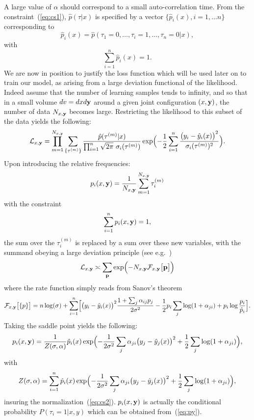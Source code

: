 \documentclass[envcountsect,runningheads]{llncs}
\theoremstyle{etoile}
\begin{document}
A large value of $\alpha$ should correspond to a small auto-correlation time. From the constraint~(\ref{eq:cs1}), $\hat p(\tau\vert x)$ is specified by  a vector
$\{\hat p_i(x),i=1,\dots n\}$ corresponding to
\[
\hat p_i(x) = \hat p(\tau_1=0,\ldots,\tau_i=1,\ldots,\tau_n=0\vert x),
\]
with 
\[
\sum_{i=1}^n \hat p_i(x) = 1.
\]
We are now in position to justify the loss function which will be used later on to train our model, as arising from a large deviation functional of the likelihood. Indeed assume that the number of learning samples tends to infinity, and so that in a small volume $dv = dxd{\bf y}$ around a given  joint configuration $(x,{\bf y})$, the number of data $N_{x,{\bf y}}$ becomes large. Restricting the likelihood to this subset of the data yields the following:
\[
{\cal L}_{x,{\bf y}} = \prod_{m=1}^{N_{x,{\bf y}}} \sum_{\{\tau^{(m)}\}} 
\frac{\hat p(\tau^{(m)}\vert x)}{\prod_{i=1}^n\sqrt{2\pi}\ \sigma_i(\tau^{(m)})}
\exp\Bigl(-\frac{1}{2}\sum_{i=1}^n\frac{\bigl(y_i-\hat y_i(x)\bigr)^2}{\sigma_i(\tau^{(m)})^2}\Bigr).
\]
Upon introducing the relative frequencies:
\[
p_i(x,{\bf y}) = \frac{1}{N_{x,{\bf y}}}\sum_{m=1}^{N_{x,{\bf y}}} \tau_i^{(m)} 
\]
with the constraint
\begin{equation}\label{eq:cs2}
\sum_{i=1}^n p_i(x,{\bf y}) = 1,
\end{equation}
the sum over the $\tau_i^{(m)}$ is replaced by a sum over these new variables, with the summand obeying a large deviation principle (see e.g.~\cite{Touchette})
\[
{\cal L}_{x,{\bf y}} \asymp \sum_{{\bf p}} 
\exp\Bigl(-N_{x,{\bf y}} {\cal F}_{x,{\bf y}}\bigl[{\bf p}\bigr]\Bigr)
\]
where the rate function simply reads from Sanov's theorem
\[
{\cal F}_{x,{\bf y}}\bigl[\{p\}\bigr] = n\log(\sigma)+
\sum_{i=1}^n\Bigl[\bigl(y_i-\hat y_i(x)\bigr)^2\frac{1+\sum_j\alpha_{ij}p_j}{2\sigma^2}
-\frac{1}{2}p_i\sum_j\log(1+\alpha_{ji})+p_i\log\frac{p_i}{\hat p_i}\Bigr].
\]
Taking the saddle point yields the following:
\begin{equation}\label{eq:hatpi}
p_i(x,{\bf y}) = \frac{1}{Z(\sigma,{\bf \alpha})}\hat p_i(x)\exp\Bigl(-\frac{1}{2\sigma^2}\sum_j\alpha_{ji}\bigl(y_j-\hat y_j(x)\bigr)^2+\frac{1}{2}\sum_j\log(1+\alpha_{ji})\Bigr),
\end{equation}
with
\[
Z(\sigma,{\bf \alpha}) = \sum_{i=1}^n\hat p_i(x)\exp\Bigl(-\frac{1}{2\sigma^2}\sum_j\alpha_{ji}\bigl(y_j-\hat y_j(x)\bigr)^2+\frac{1}{2}\sum_j\log(1+\alpha_{ji})\Bigr),
\]
insuring the normalization~(\ref{eq:cs2}). $p_i(x,{\bf y})$ is actually the conditional probability $P(\tau_i=1\vert x,y)$ which can be obtained from~(\ref{eq:py}).
\end{document}
